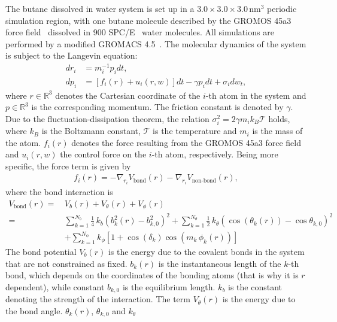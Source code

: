 \documentclass[final]{siamltex}
\newcommand{\R}{{\mathbb R}}
\begin{document}
The butane dissolved in water system is set up in a $3.0\times
3.0\times 3.0\, \textrm{nm}^3$ periodic simulation region, with one
butane molecule described by the GROMOS 45a3 force
field~\cite{schuler2001improved} dissolved in 900
SPC/E~\cite{berendsen1987missing} water molecules.
All simulations are performed by a modified GROMACS
4.5~\cite{pronk2013gromacs}.  The molecular dynamics of the system is
subject to the Langevin equation:
\begin{align}\label{eqn:langevin-r}
  dr_i &= m_i^{-1}p_idt, \\\label{eqn:langevin-p}
  dp_i &= [ f_i(r)  + u_i (r, w) ] dt - \gamma p_i dt + \sigma_i dw_t,
\end{align}
where $r\in\R^{3}$ denotes the Cartesian coordinate of the $i$-th atom in the
system and $p\in\R^{3}$ is the corresponding momentum. The friction
constant is denoted by $\gamma$. Due to the
fluctuation-dissipation theorem, the relation $\sigma_i^2 = 2\gamma
m_i k_B \mathcal T$ holds, where $k_B$ is the Boltzmann constant, $\mathcal T$ is the
temperature and $m_i$ is the mass of the atom.  $f_i(r)$
denotes the force resulting from the GROMOS 45a3 force field and $u_i(r, w)$ the
control force on the $i$-th atom, respectively. Being more specific,
the force term is given by
\begin{align}\label{eqn:gromos-inter}
  f_i(r) = -\nabla_{r_i} V_{\textrm{bond}}(r) - \nabla_{r_i} V_{\textrm{non-bond}}(r),
\end{align}
where the bond interaction is
\begin{align}\nonumber
  V_{\textrm{bond}}(r) =\,&
  V_b(r) + V_\theta(r) + V_\phi(r) \\\nonumber
  =\,&
  \sum_{k = 1}^{N_b} \frac14\, k_b(b_k^2(r) - b_{k,0}^2)^2 
  + 
  \sum_{k = 1}^{N_\theta}\frac12\, k_\theta(\cos(\theta_k(r)) - \cos\theta_{k,0})^2\\\label{eqn:gromos-bd}
  &+
  \sum_{k = 1}^{N_\phi} k_\phi [ 1 + \cos (\delta_k) \cos (m_k\,\phi_k(r))]
\end{align}
The bond potential $V_b(r)$ is the energy due to the covalent bonds in the system that
are not constrained as fixed. $b_k(r)$ is the instantaneous
length of the $k$-th bond, which depends on the coordinates of the
bonding atoms (that is why it is $r$ dependent), while constant
$b_{k,0}$ is the equilibrium length. $k_b$ is the constant denoting
the strength of the interaction. The term $V_\theta(r)$ is the energy
due to the bond angle. $\theta_k(r)$, $\theta_{k,0}$ and $k_\theta$
\end{document}
